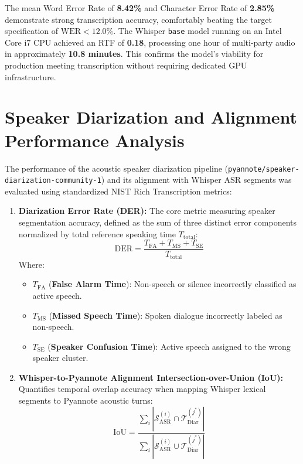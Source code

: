 \documentclass[12pt,oneside,letterpaper]{report}
\numberwithin{equation}{chapter} %
\begin{document}
The mean Word Error Rate of \textbf{8.42\%} and Character Error Rate of \textbf{2.85\%} demonstrate strong transcription accuracy, comfortably beating the target specification of $\text{WER} < 12.0\%$. The Whisper \texttt{base} model running on an Intel Core i7 CPU achieved an RTF of \textbf{0.18}, processing one hour of multi-party audio in approximately \textbf{10.8 minutes}. This confirms the model's viability for production meeting transcription without requiring dedicated GPU infrastructure.

\section{Speaker Diarization and Alignment Performance Analysis}
The performance of the acoustic speaker diarization pipeline (\texttt{pyannote/speaker-diarization-community-1}) and its alignment with Whisper ASR segments was evaluated using standardized NIST Rich Transcription metrics:

\begin{enumerate}
    \item \textbf{Diarization Error Rate (DER):} The core metric measuring speaker segmentation accuracy, defined as the sum of three distinct error components normalized by total reference speaking time $T_{\text{total}}$:
    \begin{equation}
    \text{DER} = \frac{T_{\text{FA}} + T_{\text{MS}} + T_{\text{SE}}}{T_{\text{total}}}
    \label{eq:der_formula}
    \end{equation}
    Where:
    \begin{itemize}
        \item $T_{\text{FA}}$ (\textbf{False Alarm Time}): Non-speech or silence incorrectly classified as active speech.
        \item $T_{\text{MS}}$ (\textbf{Missed Speech Time}): Spoken dialogue incorrectly labeled as non-speech.
        \item $T_{\text{SE}}$ (\textbf{Speaker Confusion Time}): Active speech assigned to the wrong speaker cluster.
    \end{itemize}

    \item \textbf{Whisper-to-Pyannote Alignment Intersection-over-Union (IoU):} Quantifies temporal overlap accuracy when mapping Whisper lexical segments to Pyannote acoustic turns:
    \begin{equation}
    \text{IoU} = \frac{\sum_{i} \left| \mathcal{S}_{\text{ASR}}^{(i)} \cap \mathcal{T}_{\text{Diar}}^{(j^*)} \right|}{\sum_{i} \left| \mathcal{S}_{\text{ASR}}^{(i)} \cup \mathcal{T}_{\text{Diar}}^{(j^*)} \right|}
    \label{eq:iou_formula}
    \end{equation}
\end{enumerate}
\end{document}
